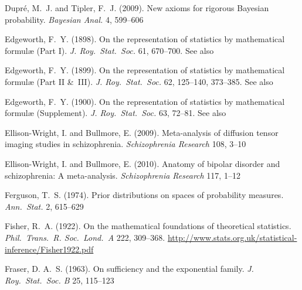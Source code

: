 \documentclass[%
]{frontiersSCNS-nologo} %
\newcommand*{\citebi}[2][]{\citet[#1]{#2}%
}
\newcommand*{\amp}{\&}
\renewcommand*{\|}{\mathpunct{|}}%
\begin{document}
\begin{thebibliography}{156}
Dupr{\'e}, M.~J. and Tipler, F.~J. (2009).
\newblock New axioms for rigorous {Bayesian} probability.
\newblock \emph{Bayesian Anal.} 4, 599--606

Edgeworth, F.~Y. (1898).
\newblock On the representation of statistics by mathematical formul{\ae}
  ({Part I}).
\newblock \emph{J. Roy.\ Stat.\ Soc.} 61, 670--700.
\newblock See also \citebi{edgeworth1899,edgeworth1900}

Edgeworth, F.~Y. (1899).
\newblock On the representation of statistics by mathematical formul{\ae}
  ({Part II \amp\ III}).
\newblock \emph{J. Roy.\ Stat.\ Soc.} 62, 125--140, 373--385.
\newblock See also \citebi{edgeworth1898,edgeworth1900}

Edgeworth, F.~Y. (1900).
\newblock On the representation of statistics by mathematical formul{\ae}
  ({Supplement}).
\newblock \emph{J. Roy.\ Stat.\ Soc.} 63, 72--81.
\newblock See also \citebi{edgeworth1898,edgeworth1899}

Ellison-Wright, I. and Bullmore, E. (2009).
\newblock Meta-analysis of diffusion tensor imaging studies in schizophrenia.
\newblock \emph{Schizophrenia Research} 108, 3--10

Ellison-Wright, I. and Bullmore, E. (2010).
\newblock Anatomy of bipolar disorder and schizophrenia: A meta-analysis.
\newblock \emph{Schizophrenia Research} 117, 1--12

Ferguson, T.~S. (1974).
\newblock Prior distributions on spaces of probability measures.
\newblock \emph{Ann.\ Stat.} 2, 615--629

Fisher, R.~A. (1922).
\newblock On the mathematical foundations of theoretical statistics.
\newblock \emph{Phil.\ Trans.\ R. Soc.\ Lond.\ A} 222, 309--368.
\newblock \url{http://www.stats.org.uk/statistical-inference/Fisher1922.pdf}

Fraser, D. A.~S. (1963).
\newblock On sufficiency and the exponential family.
\newblock \emph{J. Roy.\ Stat.\ Soc. B} 25, 115--123


\end{thebibliography}
\end{document}
